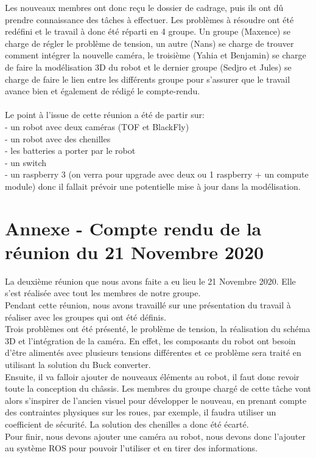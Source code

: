 \documentclass{PackagerQualityN}
\begin{document}
Les nouveaux membres ont donc reçu le dossier de cadrage, puis ils ont dû prendre connaissance des tâches à effectuer. Les problèmes à résoudre ont été redéfini et le travail à donc été réparti en 4 groupe. Un groupe (Maxence) se charge de régler le problème de tension, un autre (Nans) se charge de trouver comment intégrer la nouvelle caméra, le troisième (Yahia et Benjamin) se charge de faire la modélisation 3D du robot et le dernier groupe (Sedjro et Jules) se charge de faire le lien entre les différents groupe pour s'assurer que le travail avance bien et également de rédigé le compte-rendu.
\\
\\
Le point à l'issue de cette réunion a été de partir sur:\\
- un robot avec deux caméras (TOF et BlackFly)\\
- un robot avec des chenilles\\
- les batteries a porter par le robot\\
- un switch\\
- un raspberry 3 (on verra pour upgrade avec deux ou 1 raspberry + un compute module) donc il fallait prévoir une potentielle mise à jour dans la modélisation.

\newp
\section{Annexe - Compte rendu de la réunion du 21 Novembre 2020}
La deuxième réunion que nous avons faite a eu lieu le 21 Novembre 2020. Elle s'est réalisée avec tout les membres de notre groupe.\\

Pendant cette réunion, nous avons travaillé sur une présentation du travail à réaliser avec les groupes qui ont été définis.\\

Trois problèmes ont été présenté, le problème de tension, la réalisation du schéma 3D et l'intégration de la caméra.
En effet, les composants du robot ont besoin d’être alimentés avec plusieurs tensions différentes et ce problème sera traité en utilisant la solution du Buck converter.
\\
Ensuite, il va falloir ajouter de nouveaux éléments au robot, il faut donc revoir toute la conception du châssis.
Les membres du groupe chargé de cette tâche vont alors s’inspirer de l’ancien visuel pour développer le nouveau, en prenant compte des contraintes physiques sur les roues, par exemple, il faudra utiliser un coefficient de sécurité.
La solution des chenilles a donc été écarté.
\\
Pour finir, nous devons ajouter une caméra au robot, nous devons donc l’ajouter au système ROS pour pouvoir l’utiliser et en tirer des informations.
\\
\end{document}
